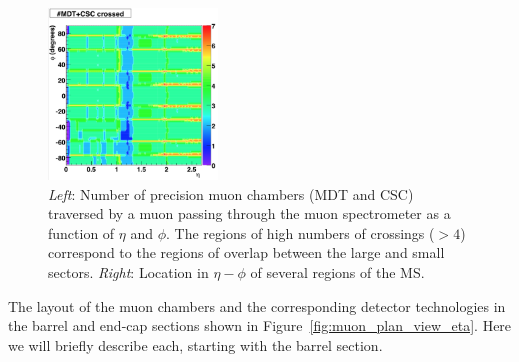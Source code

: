 \begin{figure}[!htb]
    \begin{center}
        \includegraphics[width=0.4\textwidth]{figures/chapter2/muon_spec/atlas_ms_nchamber_crossed}
        \caption{
            \textit{Left}: Number of precision muon chambers (MDT and CSC) traversed by a muon passing through the muon
                spectrometer as a function of $\eta$ and $\phi$.
                The regions of high numbers of crossings ($>4$) correspond to the regions of overlap
                between the large and small sectors.
            \textit{Right}: Location in $\eta-\phi$ of several regions of the MS.
        }
        \label{fig:muon_nchambers_crossed}
    \end{center}
\end{figure}
\FloatBarrier

The layout of the muon chambers and the corresponding detector technologies
in the barrel and end-cap sections shown in Figure~\ref{fig:muon_plan_view_eta}.
Here we will briefly describe each, starting with the barrel section.

